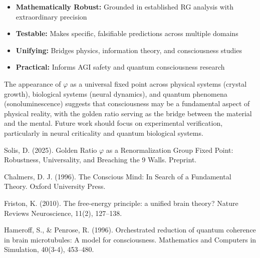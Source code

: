\documentclass[14pt, a4paper]{extarticle}
\begin{document}
\begin{itemize}
\item \textbf{Mathematically Robust:} Grounded in established RG analysis with extraordinary precision
\item \textbf{Testable:} Makes specific, falsifiable predictions across multiple domains
\item \textbf{Unifying:} Bridges physics, information theory, and consciousness studies
\item \textbf{Practical:} Informs AGI safety and quantum consciousness research
\end{itemize}

The appearance of $\varphi$ as a universal fixed point across physical systems (crystal growth), biological systems (neural dynamics), and quantum phenomena (sonoluminescence) suggests that consciousness may be a fundamental aspect of physical reality, with the golden ratio serving as the bridge between the material and the mental. Future work should focus on experimental verification, particularly in neural criticality and quantum biological systems.

\begin{thebibliography}{99}
 Solis, D. (2025). Golden Ratio $\varphi$ as a Renormalization Group Fixed Point: Robustness, Universality, and Breaching the 9 Walls. Preprint.

 Chalmers, D. J. (1996). The Conscious Mind: In Search of a Fundamental Theory. Oxford University Press.

 Friston, K. (2010). The free-energy principle: a unified brain theory? Nature Reviews Neuroscience, 11(2), 127–138.

 Hameroff, S., \& Penrose, R. (1996). Orchestrated reduction of quantum coherence in brain microtubules: A model for consciousness. Mathematics and Computers in Simulation, 40(3-4), 453–480.
\end{thebibliography}
\end{document}
